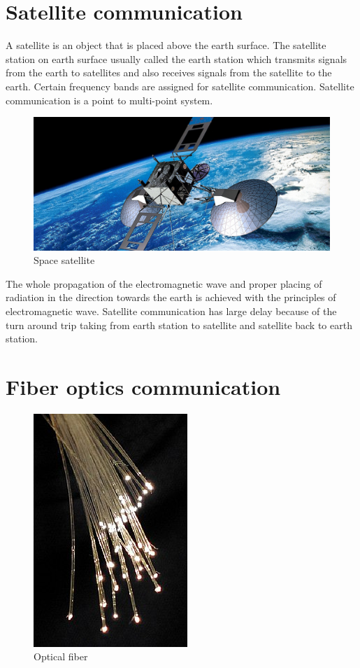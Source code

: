 \section{Satellite communication}
A satellite is an object that is placed above the earth surface. The satellite station on earth surface usually called the earth station which transmits signals from the earth to satellites and also receives signals from the satellite to the earth. Certain frequency bands are assigned for satellite communication. Satellite communication is a point to multi-point system.
\begin{figure}[h]
\centering
\includegraphics[scale=0.2]{./graphics/satellite}
\caption{Space satellite}
\end{figure}

The whole propagation of the electromagnetic wave and proper placing of radiation in the direction towards the earth is achieved with the principles of electromagnetic wave. Satellite communication has large delay because of the turn around trip taking from earth station to satellite and satellite back to earth station.

\section{Fiber optics communication}
\begin{figure}[h]
\centering
\includegraphics[scale=0.4]{./graphics/opticalfiber1}
\caption{Optical fiber}
\end{figure}

